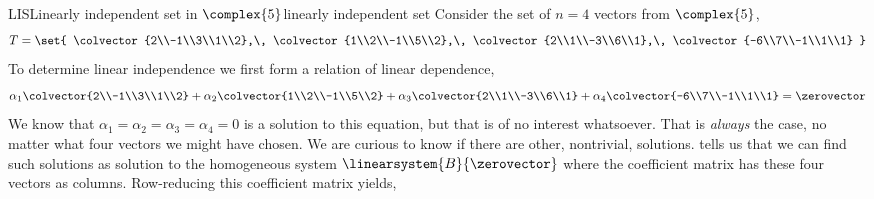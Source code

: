 \begin{example}{LIS}{Linearly independent set in $\complex{5}$}{linearly independent set}
Consider the set of $n=4$ vectors from $\complex{5}$,
%
\begin{equation*}
T=\set{
\colvector{2\\-1\\3\\1\\2},\,
\colvector{1\\2\\-1\\5\\2},\,
\colvector{2\\1\\-3\\6\\1},\,
\colvector{-6\\7\\-1\\1\\1}
}
\end{equation*}
%
To determine linear independence we first form a relation of linear dependence,
%
\begin{equation*}
\alpha_1\colvector{2\\-1\\3\\1\\2}+
\alpha_2\colvector{1\\2\\-1\\5\\2}+
\alpha_3\colvector{2\\1\\-3\\6\\1}+
\alpha_4\colvector{-6\\7\\-1\\1\\1}
=\zerovector
\end{equation*}
%
We know that $\alpha_1=\alpha_2=\alpha_3=\alpha_4=0$ is a solution to this equation, but that is of no interest whatsoever.  That is {\em always} the case, no matter what four vectors we might have chosen.  We are curious to know if there are other, nontrivial, solutions.   tells us that we can find such solutions as solution to the homogeneous system $\linearsystem{B}{\zerovector}$ where the coefficient matrix has these four vectors as columns.  Row-reducing this coefficient matrix yields,
%
\begin{align*}

\end{align*}
\end{example}
